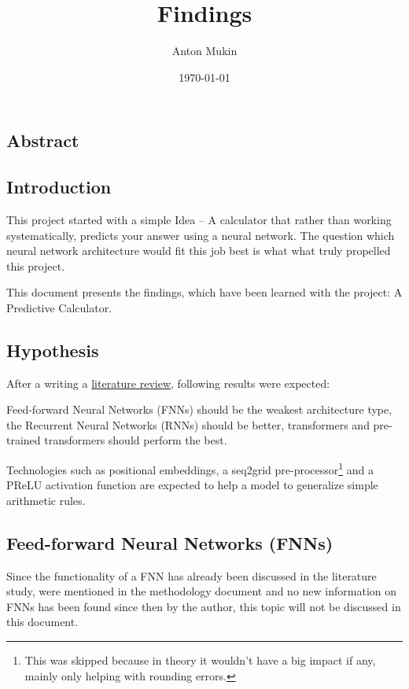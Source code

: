 \documentclass{article}
\title{Findings}
\author{Anton Mukin}
\date{\today}
\begin{document}
\maketitle

\subsection{Abstract}

\subsection{Introduction}
This project started with a simple Idea -- A calculator that rather than 
working systematically, predicts your answer using a neural network. The 
question which neural network architecture would fit this job best is what 
what truly propelled this project.

This document presents the findings, which have been learned with the 
project: A Predictive Calculator.

\subsection{Hypothesis}
After a writing a \href{https://github.com/AntonStantan/matura/blob/main/zwischenProdukt/LiteraturstudieAnton.pdf}
{literature review}, following results were expected:

Feed-forward Neural Networks (FNNs) should be the weakest architecture type, 
the Recurrent Neural Networks (RNNs) should be better, transformers and 
pre-trained transformers should perform the best.

Technologies such as positional embeddings, a seq2grid pre-processor\footnote{
This was skipped because in theory it wouldn't have a big impact if any, mainly 
only helping with rounding errors.} and a 
PReLU activation function are expected to help a model to generalize simple 
arithmetic rules.


\newpage
\tableofcontents
\newpage

\subsection{Feed-forward Neural Networks (FNNs)}
Since the functionality of a FNN has already been discussed in the 
literature study, were mentioned in the methodology document and no new 
information on FNNs has been found since then by the author, this topic 
will not be discussed in this document. 
\end{document}
